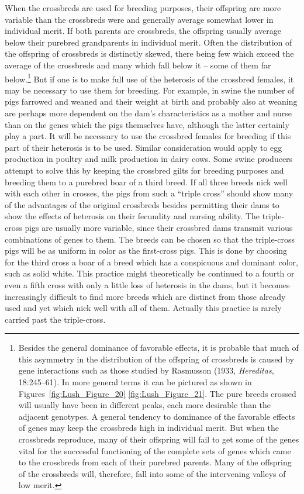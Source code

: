 When the crossbreds are used for breeding purposes, their offspring
are more variable than the crossbreds were and generally average
somewhat lower in individual merit. If both parents are crossbreds, the
offspring usually average below their purebred grandparents in individual
merit. Often the distribution of the offspring of crossbreds is
distinctly skewed, there being few which exceed the average of the crossbreds
and many which fall below it -- some of them far below.\footnote{Besides
the general dominance of favorable effects, it is probable that much of
this asymmetry in the distribution of the offspring of crossbreds is caused by gene
interactions such as those studied by Rasmusson (1933, \textit{Hereditas}, 18:245--61). In
more general terms it can be pictured as shown in Figures~\ref{fig:Lush_Figure_20}
\ref{fig:Lush_Figure_21}. The pure breeds crossed will usually have been in different
peaks, each more desirable than the adjacent genotypes. A general tendency to dominance
of the favorable effects of genes may keep the crossbreds high in individual merit. But
when the crossbreds reproduce, many of their offspring will fail to get some of the
genes vital for the successful functioning of the complete sets of genes which came
to the crossbreds from each of their purebred parents. Many of the offspring of the
crossbreds will, therefore, fall into some of the intervening valleys of low merit.}
But if one is to make full use of the heterosis of the crossbred females, it may
be necessary to use them for breeding. For example, in swine the number
of pigs farrowed and weaned and their weight at birth and probably
also at weaning are perhaps more dependent on the dam's characteristics
as a mother and nurse than on the genes which the pigs themselves
have, although the latter certainly play a part. It will be necessary to use
the crossbred females for breeding if this part of their heterosis is to be
used. Similar consideration would apply to egg production in poultry
and milk production in dairy cows. Some swine producers attempt to
solve this by keeping the crossbred gilts for breeding purposes and
breeding them to a purebred boar of a third breed. If all three breeds
nick well with each other in crosses, the pigs from such a ``triple cross''
should show many of the advantages of the original crossbreds besides
permitting their dams to show the effects of heterosis on their fecundity
and nursing ability. The triple-cross pigs are usually more variable,
since their crossbred dams transmit various combinations of genes to
them. The breeds can be chosen so that the triple-cross pigs will be as
uniform in color as the first-cross pigs. This is done by choosing for the
third cross a boar of a breed which has a conspicuous and dominant
color, such as solid white. This practice might theoretically be continued
to a fourth or even a fifth cross with only a little loss of heterosis in
the dams, but it becomes increasingly difficult to find more breeds which
are distinct from those already used and yet which nick well with all of
them. Actually this practice is rarely carried past the triple-cross.

